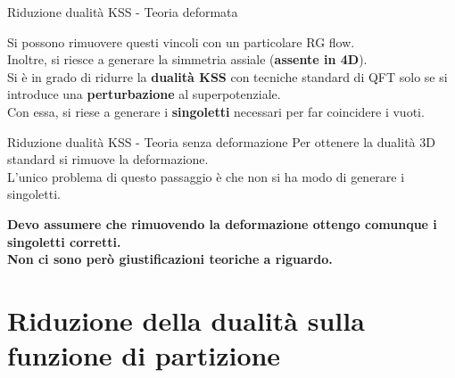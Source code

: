 \documentclass[10pt,compress,usenames,dvipsnames]{beamer}
\begin{document}

\begin{frame}{Riduzione dualità KSS - Teoria deformata}

Si possono rimuovere questi vincoli con un particolare RG flow.\\
Inoltre, si riesce a generare la simmetria assiale (\alert{\bfseries assente in 4D}).
\\
\vspace{0,6cm}
Si è in grado di ridurre la \alert{\bfseries dualità KSS} con tecniche standard di QFT solo se si introduce una \alert{\bfseries perturbazione} al superpotenziale.\\[0,2cm]
Con essa, si riese a generare i \alert{\bfseries singoletti} necessari per far coincidere i vuoti.
\\
\vspace{0,3cm}
\end{frame}


\begin{frame}{Riduzione dualità KSS - Teoria senza deformazione }
Per ottenere la dualità 3D standard si rimuove la deformazione.\\
L'unico problema di questo passaggio è che non si ha modo di generare i singoletti.
\\
\vspace{0,5cm}
\begin{center}
{\bfseries Devo assumere che rimuovendo la deformazione ottengo comunque i singoletti corretti.\\[0,3cm]
\alert{Non ci sono però giustificazioni teoriche a riguardo.}
}
\end{center}

\end{frame}





\section{Riduzione della dualità sulla funzione di partizione}
\end{document}

